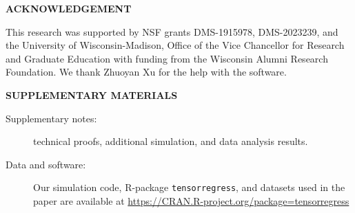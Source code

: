 \documentclass[12pt]{article}
\theoremstyle{definition}
\theoremstyle{definition}
\begin{document}
\begin{center}
{\large \bf ACKNOWLEDGEMENT}
\end{center}

This research was supported by NSF grants DMS-1915978, DMS-2023239, and the University of Wisconsin-Madison, Office of the Vice Chancellor for Research and Graduate Education with funding from the Wisconsin Alumni Research Foundation. We thank Zhuoyan Xu for the help with the software.

\begin{center}
{\large \bf SUPPLEMENTARY MATERIALS}
\end{center}

\begin{description}
\item[Supplementary notes:]  technical proofs, additional simulation, and data analysis results.
\item[Data and software:] 
Our simulation code, R-package \texttt{tensorregress}, and datasets used in the paper are available at \url{https://CRAN.R-project.org/package=tensorregress}
\end{description}




\end{document}

